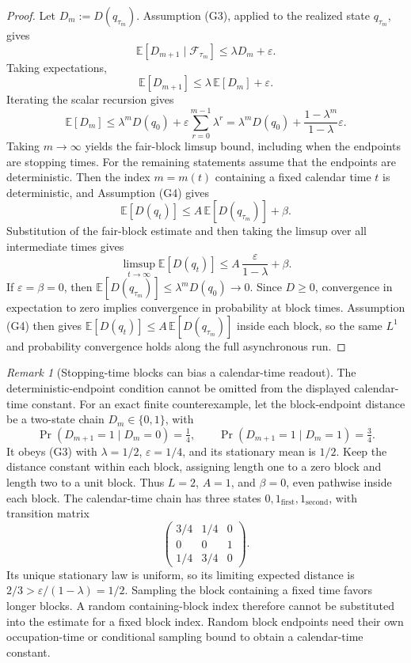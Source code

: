 \documentclass[11pt]{article}
\theoremstyle{remark}
\newtheorem{remark}[theorem]{Remark}
\theoremstyle{plain}
\begin{document}
\begin{proof}
Let \(D_m:=D(q_{\tau_m})\). Assumption (G3), applied to the realized state \(q_{\tau_m}\), gives
\[
\mathbb E[D_{m+1}\mid \mathcal F_{\tau_m}]
\le
\lambda D_m+\varepsilon.
\]
Taking expectations,
\[
\mathbb E[D_{m+1}]
\le
\lambda\,\mathbb E[D_m]+\varepsilon.
\]
Iterating the scalar recursion gives
\[
\mathbb E[D_m]
\le
\lambda^mD(q_0)
+
\varepsilon\sum_{r=0}^{m-1}\lambda^r
=
\lambda^mD(q_0)
+
\frac{1-\lambda^m}{1-\lambda}\varepsilon.
\]
Taking \(m\to\infty\) yields the fair-block limsup bound, including when
the endpoints are stopping times. For the remaining statements assume that
the endpoints are deterministic. Then the index \(m=m(t)\) containing a
fixed calendar time \(t\) is deterministic, and Assumption (G4) gives
\[
\mathbb E[D(q_t)]
\le
A\,\mathbb E[D(q_{\tau_m})]+\beta.
\]
Substitution of the fair-block estimate and then taking the limsup over all intermediate times
gives
\[
\limsup_{t\to\infty}\mathbb E[D(q_t)]
\le
A\,\frac{\varepsilon}{1-\lambda}+\beta.
\]
If \(\varepsilon=\beta=0\), then \(\mathbb E[D(q_{\tau_m})]\le\lambda^mD(q_0)\to0\). Since
\(D\ge0\), convergence in expectation to zero implies convergence in probability at block times.
Assumption (G4) then gives \(\mathbb E[D(q_t)]\le A\,\mathbb E[D(q_{\tau_m})]\) inside each
block, so the same \(L^1\) and probability convergence holds along the full asynchronous run.
\end{proof}

\begin{remark}[Stopping-time blocks can bias a calendar-time readout]
The deterministic-endpoint condition cannot be omitted from the displayed
calendar-time constant. For an exact finite counterexample, let the
block-endpoint distance be a two-state chain \(D_m\in\{0,1\}\), with
\[
 \Pr(D_{m+1}=1\mid D_m=0)=\tfrac14,
 \qquad \Pr(D_{m+1}=1\mid D_m=1)=\tfrac34.
\]
It obeys (G3) with \(\lambda=1/2\), \(\varepsilon=1/4\), and its stationary
mean is \(1/2\). Keep the distance constant within each block, assigning
length one to a zero block and length two to a unit block. Thus \(L=2\),
\(A=1\), and \(\beta=0\), even pathwise inside each block. The calendar-time
chain has three states \(0,1_{\mathrm{first}},1_{\mathrm{second}}\), with
transition matrix
\[
 \begin{pmatrix}3/4&1/4&0\\0&0&1\\1/4&3/4&0\end{pmatrix}.
\]
Its unique stationary law is uniform, so its limiting expected distance is
\(2/3>\varepsilon/(1-\lambda)=1/2\). Sampling the block containing a fixed
time favors longer blocks. A random containing-block index therefore cannot
be substituted into the estimate for a fixed block index. Random block
endpoints need their own occupation-time or conditional sampling bound to
obtain a calendar-time constant.
\end{remark}
\end{document}
